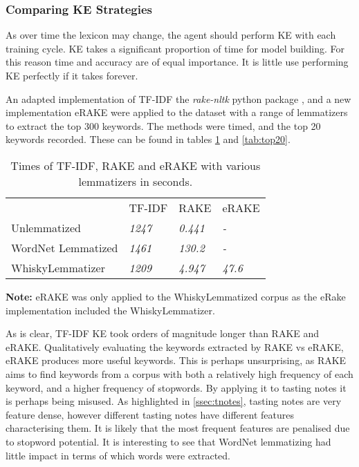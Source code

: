 \subsubsection{Comparing KE Strategies}\label{sssec:kwecomp}
As over time the lexicon may change, the agent should perform KE with each training 
cycle. KE takes a significant proportion of time for model building. For this reason time and accuracy are of equal
importance.  It is little use performing KE perfectly if it takes forever.

An adapted implementation of TF-IDF \cite{tf_idf_imp} the \emph{rake-nltk} python package \cite{sharmer_2018}, and a
new implementation eRAKE were applied to the dataset with a range of lemmatizers to extract the top 300 keywords.
The methods were timed, and the top 20 keywords recorded. 
These can be found in tables \ref{tab:times} and \ref{tab:top20}.

\begin{table}
    \centering
    \begin{threeparttable}

        \caption{Times of TF-IDF, RAKE and eRAKE with various lemmatizers in seconds.}\label{tab:times}
        \begin{tabular}{llll} 
        \toprule
                           & TF-IDF        & RAKE           & eRAKE           \\
        Unlemmatized       & \textit{1247} & \textit{0.441} & \textit{-}      \\
        WordNet Lemmatized & \textit{1461} & \textit{130.2} & \textit{-}      \\
        WhiskyLemmatizer   & \textit{1209} & \textit{4.947} & \textit{47.6}  \\
        \bottomrule
        \end{tabular}
        \begin{tablenotes}
            \small
            \item \textbf{Note:} eRAKE was only applied to the WhiskyLemmatized corpus
            as the eRake implementation included the WhiskyLemmatizer.
        \end{tablenotes}
    \end{threeparttable}
\end{table}

As is clear, TF-IDF KE took orders of magnitude longer than RAKE and eRAKE.  
Qualitatively evaluating the keywords extracted by RAKE vs eRAKE, eRAKE produces more useful keywords.
This is perhaps unsurprising, as RAKE aims to find keywords from a corpus with both a relatively high frequency
of each keyword, and a higher frequency of stopwords.  By applying it to tasting notes it is perhaps 
being misused. As highlighted in \autoref{ssec:tnotes}, tasting notes are very feature dense, however different
tasting notes have different features characterising them.  It is likely that the most frequent features are
penalised due to stopword potential. It is interesting to see that WordNet lemmatizing had little impact 
in terms of which words were extracted.

